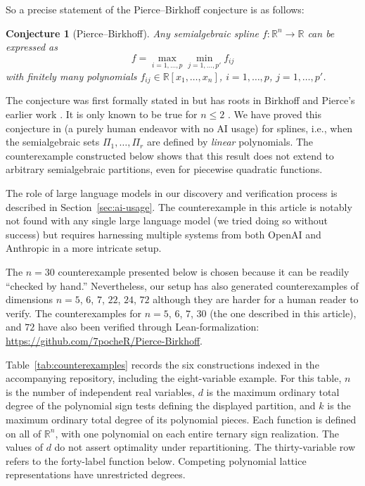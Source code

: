 \documentclass[11pt]{amsart}
\newtheorem{conjecture}[theorem]{Conjecture}
\theoremstyle{remark}
\begin{document}
So a precise statement of the Pierce--Birkhoff conjecture is as follows:
\begin{conjecture}[Pierce--Birkhoff]\label{conj:PB}
Any semialgebraic spline $f : \mathbb{R}^n \to \mathbb{R}$ can be expressed as
\begin{equation}\label{eq:PB}
f=\max_{i=1,\dots,p}\min_{j=1,\dots,p'} f_{ij}
\end{equation}
with finitely many polynomials $f_{ij} \in \mathbb{R}[x_1,\dots,x_n]$, $i =1,\dots,p$, $j=1,\dots,p'$.
\end{conjecture}
The conjecture was first formally stated in  \cite{HI} but has roots in Birkhoff and Pierce's earlier work \cite{BP}. It is only known to be true for $n \le 2$ \cite{Mahe1984}. We have proved this conjecture in \cite{LL} (a purely human endeavor with no AI usage) for splines, i.e., when the semialgebraic sets $\Pi_1,\dots,\Pi_r$ are defined by \emph{linear} polynomials. The counterexample constructed below shows that this result does not extend to arbitrary semialgebraic partitions, even for piecewise quadratic functions.

The role of large language models in our discovery and verification process is described in Section~\ref{sec:ai-usage}. The counterexample in this article is notably not found with any single large language model (we tried doing so without success) but requires harnessing multiple systems from both OpenAI and Anthropic in a more intricate setup.

The $n = 30$ counterexample presented below is chosen because it can be readily ``checked by hand.'' Nevertheless, our setup has also generated counterexamples of dimensions $n = 5$, $6$, $7$, $22$, $24$, $72$ although they are harder for a human reader to verify. The counterexamples for $n =5$, $6$, $7$, $30$ (the one described in this article), and $72$ have also been verified through Lean-formalization: \url{https://github.com/7pocheR/Pierce-Birkhoff}.



Table~\ref{tab:counterexamples} records the six constructions indexed in the accompanying repository, including the eight-variable example. For this table, $n$ is the number of independent real variables, $d$ is the maximum ordinary total degree of the polynomial sign tests defining the displayed partition, and $k$ is the maximum ordinary total degree of its polynomial pieces. Each function is defined on all of $\mathbb{R}^n$, with one polynomial on each entire ternary sign realization. The values of $d$ do not assert optimality under repartitioning. The thirty-variable row refers to the forty-label function below. Competing polynomial lattice representations have unrestricted degrees.
\end{document}
